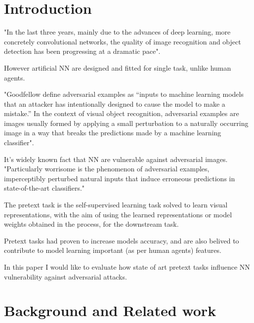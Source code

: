 \section{Introduction}
\cite{russakovsky2015imagenet} "In the last three years, mainly due to the advances of deep learning, more concretely convolutional
networks, the quality of image recognition and object detection has been progressing at a dramatic pace". \newline

However artificial NN are designed and fitted for single task, unlike human agents. \newline

\cite{DBLP:journals/corr/abs-1802-08195} "Goodfellow define adversarial examples as “inputs to machine learning models that an
attacker has intentionally designed to cause the model to make a mistake.” In the context of visual
object recognition, adversarial examples are images usually formed by applying a small perturbation
to a naturally occurring image in a way that breaks the predictions made by a machine learning
classifier". \newline

It’s widely known fact that NN are vulnerable against adversarial images. \newline
\cite{ilyas2019adversarial} "Particularly worrisome is the phenomenon of adversarial examples, imperceptibly perturbed natural inputs that induce erroneous predictions in state-of-the-art classifiers."\newline

The pretext task is the self-supervised learning task solved to learn visual representations, with the aim of using the learned representations or model weights obtained in the process, for the downstream task. \newline

\cite{kolesnikov2019revisiting} Pretext tasks had proven to increase models accuracy, and are also belived to contribute to model learning important (as per human agents) features. \newline

In this paper I would like to evaluate how state of art pretext tasks influence NN vulnerability against adversarial attacks.


\section{Background and Related work}


